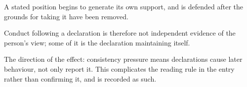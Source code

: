 

\begin{distilled}
  \item A stated position begins to generate its own support, and is defended after the grounds for taking it have been removed.
  \item Conduct following a declaration is therefore not independent evidence of the person's view; some of it is the declaration maintaining itself.
\end{distilled}

\begin{unique}
  \item The direction of the effect: consistency pressure means declarations cause later behaviour, not only report it. This complicates the reading rule in the entry rather than confirming it, and is recorded as such.
\end{unique}
